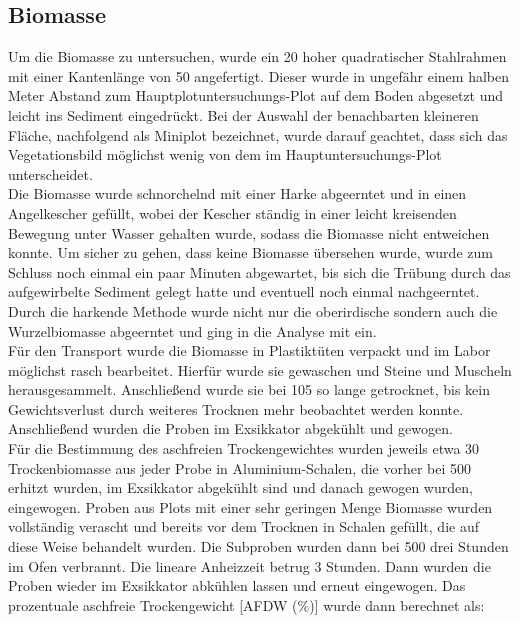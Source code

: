 \subsection{Biomasse} 


Um die Biomasse zu untersuchen, wurde ein \unit{20}{\centi\metre} hoher quadratischer Stahlrahmen mit einer Kantenlänge von \unit{50}{\centi\metre} angefertigt. Dieser wurde in ungefähr einem halben Meter Abstand zum Hauptplotuntersuchungs-Plot auf dem Boden abgesetzt und leicht ins Sediment eingedrückt. Bei der Auswahl der benachbarten kleineren Fläche, nachfolgend als Miniplot bezeichnet, wurde darauf geachtet, dass sich das Vegetationsbild  möglichst wenig von dem im Hauptuntersuchungs-Plot unterscheidet.\\
Die Biomasse wurde schnorchelnd mit einer Harke abgeerntet und in einen Angelkescher gefüllt, wobei der Kescher ständig in einer leicht kreisenden Bewegung unter Wasser gehalten wurde, sodass die Biomasse nicht entweichen konnte. Um sicher zu gehen, dass keine Biomasse übersehen wurde, wurde zum Schluss noch einmal ein paar Minuten abgewartet, bis sich die Trübung durch das aufgewirbelte Sediment gelegt hatte und eventuell noch einmal nachgeerntet. Durch die harkende Methode wurde nicht nur die oberirdische sondern auch die Wurzelbiomasse abgeerntet und ging in die Analyse mit ein.\\
Für den Transport wurde die Biomasse in Plastiktüten verpackt und im Labor möglichst rasch bearbeitet. Hierfür wurde sie gewaschen und Steine und Muscheln herausgesammelt. Anschließend wurde sie bei \unit{105}{\celsius} so lange getrocknet, bis kein Gewichtsverlust durch weiteres Trocknen mehr beobachtet werden konnte. Anschließend wurden die Proben im Exsikkator abgekühlt und gewogen. \\
Für die Bestimmung des aschfreien Trockengewichtes wurden jeweils etwa \unit{30}{\gram} Trockenbiomasse aus jeder Probe in  Aluminium-Schalen, die vorher bei \unit{500}{\celsius} erhitzt wurden, im Exsikkator abgekühlt sind und danach gewogen wurden, eingewogen. Proben aus Plots mit einer sehr geringen Menge Biomasse wurden vollständig verascht und bereits vor dem Trocknen in Schalen gefüllt, die auf diese Weise behandelt wurden. Die Subproben wurden dann bei \unit{500}{\celsius} drei Stunden im Ofen verbrannt. Die lineare Anheizzeit betrug 3 Stunden. Dann wurden die Proben wieder im Exsikkator abkühlen lassen und erneut eingewogen. Das prozentuale aschfreie Trockengewicht [AFDW (\%)] wurde dann berechnet als:

